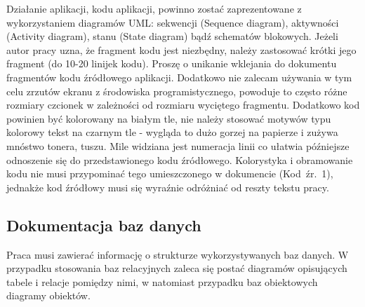 \documentclass[12pt,a4paper]{article}
\begin{document}
Działanie aplikacji, kodu aplikacji, powinno zostać zaprezentowane z wykorzystaniem diagramów UML\cite{UML}: sekwencji (Sequence diagram), aktywności (Activity diagram), stanu (State diagram) bądź schematów blokowych.  Jeżeli autor pracy uzna, że fragment kodu jest niezbędny, należy zastosować krótki jego fragment (do 10-20 linijek kodu). Proszę o unikanie wklejania do dokumentu fragmentów kodu źródłowego aplikacji. Dodatkowo nie zalecam używania w tym celu zrzutów ekranu z środowiska programistycznego, powoduje to często różne rozmiary czcionek w zależności od rozmiaru wyciętego fragmentu. Dodatkowo kod powinien być kolorowany na białym tle, nie należy stosować motywów typu kolorowy tekst na czarnym tle - wygląda to dużo gorzej na papierze i zużywa mnóstwo tonera, tuszu. Mile widziana jest numeracja linii co ułatwia późniejsze odnoszenie się do przedstawionego kodu źródłowego. Kolorystyka i obramowanie kodu nie musi przypominać tego umieszczonego w dokumencie (Kod~źr.~1), jednakże kod źródłowy musi się wyraźnie odróżniać od reszty tekstu pracy.




\subsection{Dokumentacja baz danych}
Praca musi zawierać informację o strukturze wykorzystywanych baz danych. W przypadku stosowania baz relacyjnych zaleca się postać diagramów opisujących tabele i relacje pomiędzy nimi, w natomiast przypadku baz obiektowych diagramy obiektów.

\end{document}

